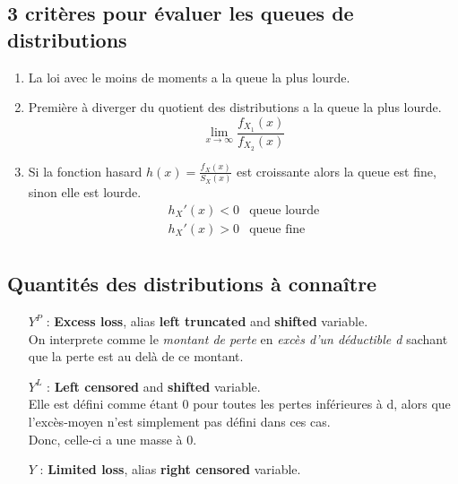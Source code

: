 \documentclass[10pt, french]{article}
\begin{document}
\begin{multicols*}{3}
\begin{tikzpicture}[x=0.75pt,y=0.75pt,yscale=-1,xscale=1]
\end{tikzpicture}

\subsection*{3 critères pour évaluer les queues de distributions}

\begin{enumerate}

\item La loi avec le moins de moments a la queue la plus lourde.
\item Première à diverger du quotient des distributions a la queue la plus lourde.
\[\lim_{x \to \infty} \frac{f_{X_1}(x)}{f_{X_2}(x)}\]
\item Si la fonction hasard $h(x) = \frac{f_X(x)}{S_X(x)}$ est croissante alors la queue est fine, sinon elle est lourde.
\[
\begin{matrix}
	h_X'(x) < 0 & \text{queue lourde} \\
	h_X'(x) > 0 & \text{queue fine} \\
\end{matrix}
\]
\end{enumerate}


\subsection*{Quantités des distributions à connaître}

\begin{itemize}
\item[$Y^P$ : ] 
	\textbf{Excess loss}, alias \textbf{left truncated} and \textbf{shifted} variable. \\
	On interprete comme le \textit{montant de perte} en \textit{excès d'un déductible d} sachant que la perte est au delà de ce montant.


\item[$Y^L$ : ] 
	\textbf{Left censored} and \textbf{shifted} variable. \\ 
	Elle est défini comme étant 0 pour toutes les pertes inférieures à d, alors que l'excès-moyen n'est simplement pas défini dans ces cas. \\
	Donc, celle-ci a une masse à 0.


\item[$Y$ : ] 
	\textbf{Limited loss}, alias \textbf{right censored} variable. \\ 
	



\end{itemize}
\end{multicols*}
\end{document}
